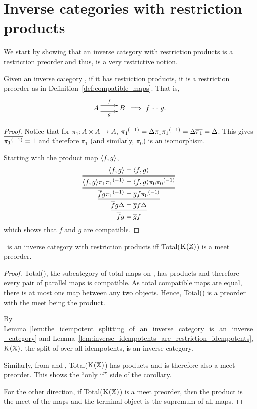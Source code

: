 \section{Inverse categories with restriction products} %
\label{sec:inverse_categories_with_restriction_products}
We start by showing that an inverse category with restriction products is a restriction preorder
and thus, is a very restrictive notion.
\begin{proposition}\label{prop:an_inverse_category_with_products_is_a_restriction_preorder}
  Given an inverse category \X, if it has restriction products, it is a restriction preorder as in
  Definition~\ref{def:compatible_maps}. That is,
  \[
    \xymatrix {
      A  \ar@<1ex>[r]^{f} \ar@<-1ex>[r]_{g} &B
    }
    \implies f \compatible g.
  \]
\end{proposition}
\begin{proof}
  Notice that for $\pi_1:A\times A \to A$, ${\pi_1}^{(-1)}  = \Delta \pi_1 {\pi_1}^{(-1)} =\Delta \overline{\pi_1} = \Delta$.
  This gives $\overline{{\pi_1}^{(-1)}} = 1$ and therefore $\pi_1$ (and similarly, $\pi_0$) is an
  isomorphism.

  Starting with the product map $\langle f,g\rangle$,
  \[
    \infer={\restr{f}g = \restr{g}f}
    {\infer={\restr{f}g\Delta = \restr{g}f\Delta}
    {\infer={\restr{f}g\inv{\pi_1} = \restr{g}f\inv{\pi_0}}
    {\infer={\<f,g\>\pi_1 \inv{\pi_1} = \<f,g\>\pi_0 \inv{\pi_0}}
    {\<f,g\> = \<f,g\>}}}}
  \]
  which shows that $f$ and $g$ are compatible.
\end{proof}

\begin{corollary}
  \X\ is an inverse category with restriction products iff Total($\text{K}_{}(\mathbb{X})$) is a meet preorder.
\end{corollary}

\begin{proof}
  Total(\X), the subcategory of total maps on \X, has products and therefore every pair of parallel
  maps is compatible. As total compatible maps are equal, there is at most
  one map between any two objects. Hence, Total(\X) is a preorder with the meet being the product.

  By Lemma~\ref{lem:the_idempotent_splitting_of_an_inverse_category_is_an_inverse_category} and
  Lemma~\ref{lem:inverse_idempotents_are_restriction_idempotents}, $\text{K}_{}(\mathbb{X})$, the split of \X
  over all idempotents, is an inverse category.

  Similarly, from \cite{cockett2002:restcategories1} and \cite{cockettlack2004:restcategories3},
  Total($\text{K}_{}(\mathbb{X})$) has products and is therefore also a meet  preorder. This shows the ``only
  if'' side of the corollary.

  For the other direction, if Total($\text{K}_{}(\mathbb{X})$) is a meet preorder, then the product is the
  meet of the maps and the terminal object is the supremum of all maps.
\end{proof}

